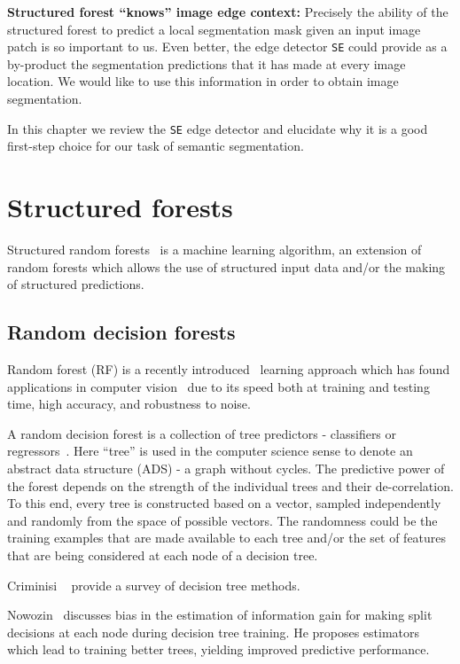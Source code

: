 \textbf{Structured forest ``knows'' image edge context:} Precisely the ability of the structured forest to predict a local segmentation mask given an input image patch is so important to us. Even better, the edge detector {\tt SE} could provide as a by-product the segmentation predictions that it has made at every image location. We would like to use this information in order to obtain image segmentation.

In this chapter we review the {\tt SE} edge detector and elucidate why it is a good first-step choice for our task of semantic segmentation.

\section{Structured forests}
Structured random forests~\cite{KontschiederBBP11,DollarICCV13edges} is a machine learning algorithm, an extension of random forests which allows the use of structured input data and\slash or the making of structured predictions.

\subsection{Random decision forests}
Random forest (RF) is a recently introduced~\cite{Breiman01} learning approach which has found applications in computer vision~\cite{KontschiederBBP11,LimZD13,DollarICCV13edges,Dollar2015PAMI} due to its speed both at training and testing time, high accuracy, and robustness to noise.

A random decision forest is a collection %
of tree predictors - classifiers or regressors~\cite{breiman1984classification}. Here ``tree'' is used in the computer science sense to denote an abstract data structure (ADS) - a graph without cycles. 
The predictive power of the forest depends on the strength of the individual trees and their de-correlation. To this end, %
every tree is constructed based on a vector, sampled independently and randomly from the space of possible vectors. The randomness could be \wrt the training examples that are made available to each tree and\slash or the set of features that are being considered at each node of a decision tree.

Criminisi \etal~\cite{Criminisi12} provide a survey of decision tree methods.

Nowozin~\cite{Nowozin12improvedinformation,nowozin2014decision} discusses bias in the estimation of information gain for making split decisions at each node during decision tree training. He proposes estimators which lead to training better trees, yielding improved predictive performance.

